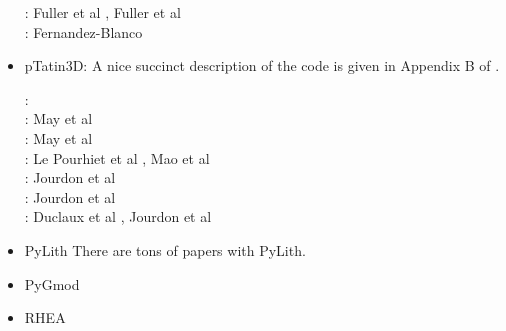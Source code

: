 \begin{itemize}
\begin{scriptsize}
\twothousandsix: Fuller et al \cite{fuwb06}, Fuller et al \cite{fuwf06}\\
\twothousandtwenty: Fernandez-Blanco \cite{femb20}
\end{scriptsize}

\item pTatin3D: A nice succinct description of the code is given in Appendix B of \cite{lemh17}. 

\begin{scriptsize}
\twothousandthirteen: \cite{phil13}\\
\twothousandfourteen: May et al \cite{mabl14}\\
\twothousandfifteen: May et al \cite{mabl15}\\
\twothousandseventeen: Le Pourhiet et al \cite{lemh17}, Mao et al \cite{magm17}\\
\twothousandeighteen: Jourdon et al \cite{jolp18}\\
\twothousandnineteen: Jourdon et al \cite{jolm19}\\
\twothousandtwenty: Duclaux et al \cite{duhm20}, Jourdon et al \cite{jolm20}
\end{scriptsize}

\item PyLith 
There are tons of papers with PyLith. 

{\small
\noindent
\cite{aakw13}
}

\item PyGmod 

{\small
\noindent
\cite{crvs15}
}


\item RHEA 

{\small
\noindent
\cite{bugg08}
\cite{stgb10}
\cite{algs12}
\cite{busa13}
}


\end{itemize}
